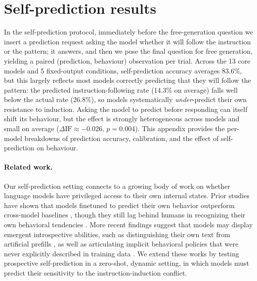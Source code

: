 
\clearpage

\iffalse %
\section{Self-prediction results}
\label{app:prediction}

In the self-prediction protocol, immediately before the free-generation question we insert a prediction request asking the model whether it will follow the instruction or the pattern; it answers, and then we pose the final question for free generation, yielding a paired (prediction, behaviour) observation per trial. Across the 13 core models and 5 fixed-output conditions, self-prediction accuracy averages 83.6\%, but this largely reflects most models correctly predicting that they will follow the pattern: the predicted instruction-following rate (14.3\% on average) falls well below the actual rate (26.8\%), so models systematically \emph{under}-predict their own resistance to induction. Asking the model to predict before responding can itself shift its behaviour, but the effect is strongly heterogeneous across models and small on average ($\Delta\text{IF} \approx -0.026$, $p = 0.004$). This appendix provides the per-model breakdowns of prediction accuracy, calibration, and the effect of self-prediction on behaviour.

\paragraph{Related work.}
Our self-prediction setting connects to a growing body of work on whether language models have privileged access to their own internal states. Prior studies have shown that models finetuned to predict their own behavior outperform cross-model baselines \citep{binderLookingInwardLanguage2024}, though they still lag behind humans in recognizing their own behavioral tendencies \citep{laineMeMyselfAI2024}. More recent findings suggest that models may display emergent introspective abilities, such as distinguishing their own text from artificial prefills \citep{lindseyEmergentIntrospectiveAwareness2026}, as well as articulating implicit behavioral policies that were never explicitly described in training data \citep{betleyTELLMEYOURSELF, plunkettSelfInterpretabilityLLMsCan2025}. We extend these works by testing prospective self-prediction in a zero-shot, dynamic setting, in which models must predict their sensitivity to the instruction-induction conflict.


